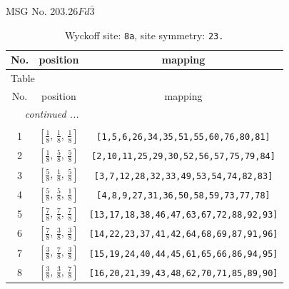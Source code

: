 \documentclass[fleqn,8pt]{jsarticle}
\begin{document}
\setcounter{MaxMatrixCols}{32}

\renewcommand{\tablename}{Table~}
\renewcommand{\figurename}{Figure~}
\begin{center}
\LARGE
MSG No. 203.26\quad$Fd\bar{3}$
\end{center}
\renewcommand{\arraystretch}{1.2}
\begin{longtable}{ccc}
\caption{Wyckoff site: {\tt 8a}, site symmetry: {\tt 23.}}
 \\
 \hline \hline
No. & position & mapping \\ \hline \endfirsthead

\multicolumn{2}{l}{\tablename\ \thetable{}} \\
 \hline \hline
No. & position & mapping \\ \hline \endhead

 \hline \hline
\multicolumn{2}{r}{\footnotesize\it continued ...} \\ \endfoot

 \hline \hline
\multicolumn{2}{r}{} \\ \endlastfoot

1 & $\left[ \frac{1}{8},\, \frac{1}{8},\, \frac{1}{8} \right]$ & {\tt [1,5,6,26,34,35,51,55,60,76,80,81]} \\ \hline
2 & $\left[ \frac{1}{8},\, \frac{5}{8},\, \frac{5}{8} \right]$ & {\tt [2,10,11,25,29,30,52,56,57,75,79,84]} \\ \hline
3 & $\left[ \frac{5}{8},\, \frac{1}{8},\, \frac{5}{8} \right]$ & {\tt [3,7,12,28,32,33,49,53,54,74,82,83]} \\ \hline
4 & $\left[ \frac{5}{8},\, \frac{5}{8},\, \frac{1}{8} \right]$ & {\tt [4,8,9,27,31,36,50,58,59,73,77,78]} \\ \hline
5 & $\left[ \frac{7}{8},\, \frac{7}{8},\, \frac{7}{8} \right]$ & {\tt [13,17,18,38,46,47,63,67,72,88,92,93]} \\ \hline
6 & $\left[ \frac{7}{8},\, \frac{3}{8},\, \frac{3}{8} \right]$ & {\tt [14,22,23,37,41,42,64,68,69,87,91,96]} \\ \hline
7 & $\left[ \frac{3}{8},\, \frac{7}{8},\, \frac{3}{8} \right]$ & {\tt [15,19,24,40,44,45,61,65,66,86,94,95]} \\ \hline
8 & $\left[ \frac{3}{8},\, \frac{3}{8},\, \frac{7}{8} \right]$ & {\tt [16,20,21,39,43,48,62,70,71,85,89,90]} \\
\end{longtable}
\renewcommand{\arraystretch}{1.2}
\end{document}

